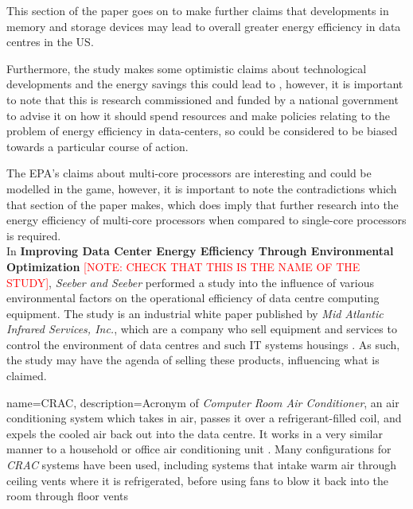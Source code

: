 This section of the paper goes on to make further claims that developments in memory and storage devices may lead to overall greater energy efficiency in data centres in the US.

Furthermore, the study makes some optimistic claims about technological developments and the energy savings this could lead to \cite[3.1 Expected Energy Savings from Current Energy Efficiency Trends]{USCongressDataCenterEfficiencyReport}, however, it is important to note that this is research commissioned and funded by a national government to advise it on how it should spend resources and make policies relating to the problem of energy efficiency in data-centers, so could be considered to be biased towards a particular course of action.

The EPA's claims \cite[3.1 Expected Energy Savings from Current Energy Efficiency Trends]{USCongressDataCenterEfficiencyReport} about multi-core processors are interesting and could be modelled in the game, however, it is important to note the contradictions which that section of the paper makes, which does imply that further research into the energy efficiency of multi-core processors when compared to single-core processors is required.
\\

In \textbf{Improving Data Center Energy Efficiency Through Environmental Optimization} \textcolor{red}{[NOTE: CHECK THAT THIS IS THE NAME OF THE STUDY]}, \emph{Seeber and Seeber} \cite{SeeberAndSeeberImprovingDataCenterEnergyEfficiencyThroughEnvironmentalOptimization} performed a study into the influence of various environmental factors on the operational efficiency of data centre computing equipment. The study is an industrial white paper published by \emph{Mid Atlantic Infrared Services, Inc.}, which are a company who sell equipment and services to control the environment of data centres and such IT systems housings \cite{MidAtlanticInfraredWebsite}. As such, the study may have the agenda of selling these products, influencing what is claimed.

{
  name=CRAC,
  description={Acronym of \emph{Computer Room Air Conditioner}, an air conditioning system which takes in air, passes it over a refrigerant-filled coil, and expels the cooled air back out into the \gls{data centre}. It works in a very similar manner to a household or office air conditioning unit \cite[CRAC]{DataCenterHuddleCRACVsCRAHDefinition}. Many   configurations for \emph{CRAC} systems have been used, including systems that intake warm air through ceiling vents where it is refrigerated, before using fans to blow it back into the room through floor vents \cite{CRACDefinition-SearchDataCenter}}
}

